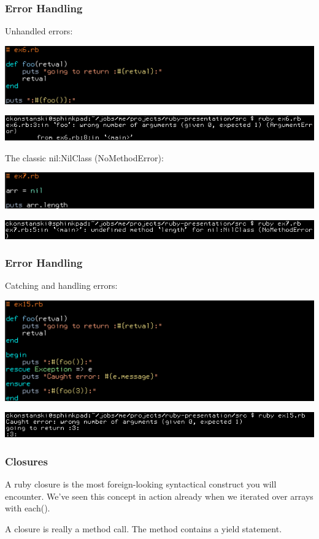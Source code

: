 \documentclass[helvetica,english,utf8,notitle,nologo]{beamer}
\begin{document}
\begin{frame}
  \frametitle{Error Handling}

  Unhandled errors:

  \includegraphics[scale=0.53]{src_6}

  \includegraphics[scale=0.5]{out_6}

  The classic nil:NilClass (NoMethodError):

  \includegraphics[scale=0.53]{src_7}

  \includegraphics[scale=0.5]{out_7}
\end{frame}

\begin{frame}
  \frametitle{Error Handling}

  Catching and handling errors:

  \includegraphics[scale=0.53]{src_15}

  \includegraphics[scale=0.5]{out_15}
\end{frame}

\begin{frame}
  \frametitle{Closures}

  A ruby closure is the most foreign-looking syntactical construct you
  will encounter. We've seen this concept in action already when we
  iterated over arrays with each().

  A closure is really a method call. The method contains a yield
  statement. 
\end{frame}
\end{document}
